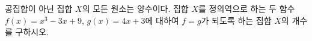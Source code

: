 공집합이 아닌 집합 $X$의 모든 원소는 양수이다. 집합 $X$를 정의역으로 하는 두 함수 $f(x)=x^3-3x+9$, $g(x)=4x+3$에 대하여 $f=g$가 되도록 하는 집합 $X$의 개수를 구하시오.
